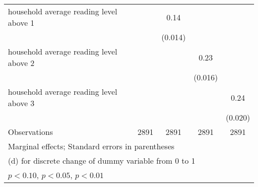 \begin{table}[htbp]
\begin{tabular*}{1\hsize}{@{\hskip\tabcolsep\extracolsep\fill}l*{4}{c}}
household average reading level above 1&                  &     0.14\sym{***}&                  &                  \\
                &                  &  (0.014)         &                  &                  \\
household average reading level above 2&                  &                  &     0.23\sym{***}&                  \\
                &                  &                  &  (0.016)         &                  \\
household average reading level above 3&                  &                  &                  &     0.24\sym{***}\\
                &                  &                  &                  &  (0.020)         \\
\midrule
Observations    &     2891         &     2891         &     2891         &     2891         \\
\bottomrule
\multicolumn{5}{l}{\footnotesize Marginal effects; Standard errors in parentheses}\\
\multicolumn{5}{l}{\footnotesize  (d) for discrete change of dummy variable from 0 to 1}\\
\multicolumn{5}{l}{\footnotesize \sym{*} \(p<0.10\), \sym{**} \(p<0.05\), \sym{***} \(p<0.01\)}\\
\end{tabular*}
\end{table}
